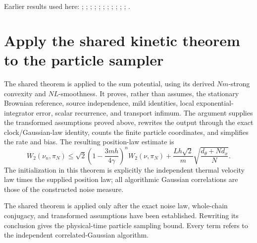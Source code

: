 \documentclass[11pt,a4paper]{article}
\begin{document}
Earlier results used here: \cite[Section~3.17.1]{LangevinLean2026ULASC}; \cite[Section~3.17.3]{LangevinLean2026ULASC}; \cite[Section~3.21.2]{LangevinLean2026ULASC}; \cite[Section~3.26.15]{LangevinLean2026ULASC}; \cite[Section~3.26.3]{LangevinLean2026ULASC}; \cite[Section~3.1.1]{LangevinLean2026IPLA}; \cite[Section~3.1.3]{LangevinLean2026IPLA}; \cite[Section~3.1.4]{LangevinLean2026IPLA}; \cite[Section~3.3.2]{LangevinLean2026IPLA}; \cite[Section~3.5.1]{LangevinLean2026IPLA}; \cite[Section~3.57.17]{LangevinLean2026Kinetic}; \cite[Section~3.57.18]{LangevinLean2026Kinetic}.

\section{\texorpdfstring{Apply the shared kinetic theorem to the particle sampler}{Apply the shared kinetic theorem to the particle sampler}}


The shared theorem is applied to the sum potential, using its derived \(Nm\)-strong convexity and \(NL\)-smoothness. It proves, rather than assumes, the stationary Brownian reference, source independence, mild identities, local exponential-integrator error, scalar recurrence, and transport infimum. The argument supplies the transformed assumptions proved above, rewrites the output through the exact clock/\allowbreak{}Gaussian-law identity, counts the finite particle coordinates, and simplifies the rate and bias. The resulting position-law estimate is \[W_2(\nu_n,\pi_N)\le\sqrt2\left(1-\frac{3mh}{4\gamma}\right)^nW_2(\nu,\pi_N)+\frac{Lh\sqrt2}{m}\sqrt{\frac{d_\theta+Nd_x}{N}}.\] The initialization in this theorem is explicitly the independent thermal velocity law times the supplied position law; all algorithmic Gaussian correlations are those of the constructed noise measure.



The shared theorem is applied only after the exact noise law, whole-chain conjugacy, and transformed assumptions have been established. Rewriting its conclusion gives the physical-time particle sampling bound. Every term refers to the independent correlated-Gaussian algorithm.
\end{document}
